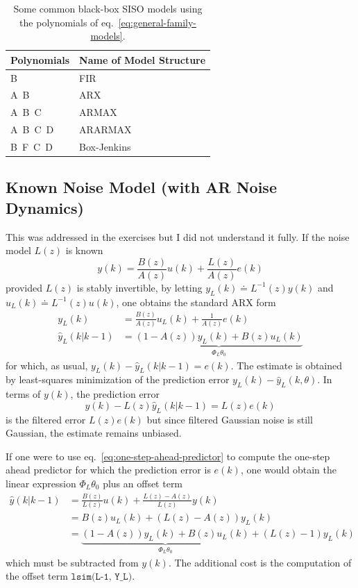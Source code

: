 \begin{table}[h]
  \centering
  \begin{tabular}[h]{ll}
    \toprule
    Polynomials & Name of Model Structure \\
    \midrule
    B & FIR \\
    A\ B & ARX \\
    A\ B\ C & ARMAX \\
    A\ B\ C\ D & ARARMAX \\
    B\ F\ C\ D & Box-Jenkins \\
    \bottomrule
  \end{tabular}
  \caption{Some common black-box SISO models using the polynomials of eq.~\eqref{eq:general-family-models}.}
  \label{tbl:black-box-models}
\end{table}

\subsection{Known Noise Model (with AR Noise Dynamics)}
\label{sec:known-noise-model}

This was addressed in the exercises but I did not understand it fully. If the noise model $L(z)$ is known
\begin{equation*}
  y(k) = \frac{B(z)}{A(z)}u(k) + \frac{L(z)}{A(z)}e(k)
\end{equation*}
provided $L(z)$ is stably invertible, by letting $y_L(k)\doteq L^{-1}(z)y(k)$ and $u_L(k)\doteq L^{-1}(z)u(k)$, one obtains the standard ARX form
\begin{align*}
  y_L(k) &= \frac{B(z)}{A(z)}u_L(k) + \frac{1}{A(z)}e(k) \\
  \hat{y}_L(k|k-1) &= \underbrace{\left(1-A(z)\right)y_L(k) + B(z)u_L(k)}_{\Phi_L\theta_0}
\end{align*}
for which, as usual, $y_L(k) - \hat{y}_L(k|k-1) = e(k)$. The estimate is obtained by least-squares minimization of the prediction error $y_L(k) - \hat{y}_L(k,\theta)$. In terms of $y(k)$, the prediction error
\begin{equation*}
  y(k) - L(z)\hat{y}_L(k|k-1) = L(z)e(k)
\end{equation*}
is the filtered error $L(z)e(k)$ but since filtered Gaussian noise is still Gaussian, the estimate remains unbiased.

If one were to use eq.~\eqref{eq:one-step-ahead-predictor} to compute the one-step ahead predictor for which the prediction error is $e(k)$, one would obtain the linear expression $\Phi_L\theta_0$ plus an offset term
\begin{align*}
  \hat{y}(k|k-1) &= \frac{B(z)}{L(z)}u(k) + \frac{L(z)-A(z)}{L(z)}y(k) \\
                 &= B(z)u_L(k) + \left(L(z)-A(z)\right)y_L(k) \\
                 &= \underbrace{\left(1-A(z)\right)y_L(k) + B(z)u_L(k)}_{\Phi_L\theta_0} + \left(L(z)-1\right)y_L(k)
\end{align*}
which must be subtracted from $y(k)$. The additional cost is the computation of the offset term $\texttt{lsim(L-1, Y\_L)}$.


